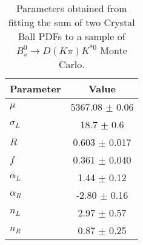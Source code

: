 \begin{table}[h]
  \centering
  \begin{tabular}{lc}
      \toprule
      Parameter & Value \\
      \midrule
      $\mu$ & 5367.08 $\pm$ 0.06 \\
      $\sigma_L$ & 18.7 $\pm$ 0.6 \\
      $R$ & 0.603 $\pm$ 0.017 \\
      $f$ & 0.361 $\pm$ 0.040 \\
      $\alpha_L$ & 1.44 $\pm$ 0.12 \\
      $\alpha_R$ & -2.80 $\pm$ 0.16 \\
      $n_L$ & 2.97 $\pm$ 0.57 \\
      $n_R$ & 0.87 $\pm$ 0.25 \\
  \bottomrule
  \end{tabular}
  \caption{Parameters obtained from fitting the sum of two Crystal Ball PDFs to a sample of $B^0_s \to D(K\pi)K^{*0}$ Monte Carlo.}
\label{tab:signal_Bs_MC_params}
\end{table}
